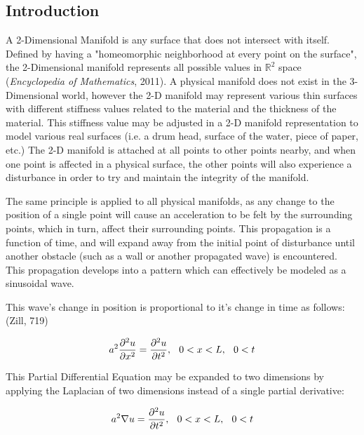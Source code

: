\documentclass{article}
\begin{document}
\begin{multicols}{2}
\section{Introduction}
A 2-Dimensional Manifold is any surface that does not intersect with itself. Defined by having a "homeomorphic neighborhood at every point on the surface", the 2-Dimensional manifold represents all possible values in $\mathbb{R}^2$ space (\textit{Encyclopedia of Mathematics}, 2011). A physical manifold does not exist in the 3-Dimensional world, however the 2-D manifold may represent various thin surfaces with different stiffness values related to the material and the thickness of the material. This stiffness value may be adjusted in a 2-D manifold representation to model various real surfaces (i.e. a drum head, surface of the water, piece of paper, etc.) The 2-D manifold is attached at all points to other points nearby, and when one point is affected in a physical surface, the other points will also experience a disturbance in order to try and maintain the integrity of the manifold. 

The same principle is applied to all physical manifolds, as any change to the position of a single point will cause an acceleration to be felt by the surrounding points, which in turn, affect their surrounding points. This propagation is a function of time, and will expand away from the initial point of disturbance until another obstacle (such as a wall or another propagated wave) is encountered. This propagation develops into a pattern which can effectively be modeled as a sinusoidal wave.

This wave's change in position is proportional to it's change in time as follows: (Zill, 719)

\begin{equation}
    \label{equation1}
    a^2\frac{\partial^2u}{\partial x^2} = \frac{\partial^2u}{\partial t^2}, \hspace{0.1in} 0 < x < L, \hspace{0.1in} 0 < t
\end{equation}

This Partial Differential Equation may be expanded to two dimensions by applying the Laplacian of two dimensions instead of a single partial derivative:

\begin{equation}
    \label{equation2}
    a^2\nabla u  = \frac{\partial^2u}{\partial t^2}, \hspace{0.1in} 0 < x < L, \hspace{0.1in} 0 < t
\end{equation}


\end{multicols}
\end{document}
